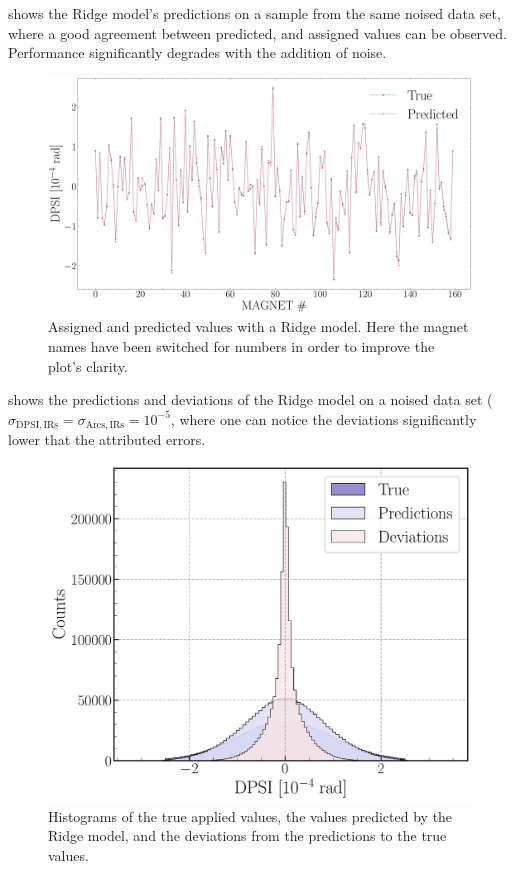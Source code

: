  shows the Ridge model's predictions on a sample from the same noised data set, where a good agreement between predicted, and assigned values can be observed.
Performance significantly degrades with the addition of noise.

\begin{figure}[!htb]
  \centering
  \includegraphics*[width=0.9\columnwidth]{Figures/ML_for_IR_Coupling/ridge_predictions.pdf}
  \caption{Assigned and predicted values \DPSI with a Ridge model. Here the magnet names have been switched for numbers in order to improve the plot's clarity.}
  \label{fig:ridge_predictions}
\end{figure}

 shows the predictions and deviations of the Ridge model on a noised data set (\(\sigma_{\mathrm{DPSI, IRs}} = \sigma_{\mathrm{Arcs, IRs}} = 10^{-5}\), where one can notice the deviations significantly lower that the attributed errors.

\begin{figure}[!htb]
  \centering
  \includegraphics*[width=0.9\columnwidth]{Figures/ML_for_IR_Coupling/ridge_histograms.pdf}
  \caption{Histograms of the true applied \DPSI values, the values predicted by the Ridge model, and the deviations from the predictions to the true values.}
  \label{fig:ridge_histograms}
\end{figure}

